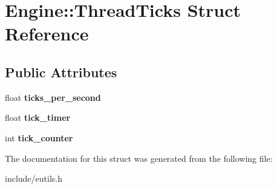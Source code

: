 \hypertarget{structEngine_1_1ThreadTicks}{}\section{Engine\+:\+:Thread\+Ticks Struct Reference}
\label{structEngine_1_1ThreadTicks}
\subsection*{Public Attributes}
\begin{DoxyCompactItemize}
\item 
\hypertarget{structEngine_1_1ThreadTicks_ae71adf8aee101beda4a5a500e886b13c}{}float {\bfseries ticks\+\_\+per\+\_\+second}\label{structEngine_1_1ThreadTicks_ae71adf8aee101beda4a5a500e886b13c}

\item 
\hypertarget{structEngine_1_1ThreadTicks_ab4cc7f346cc86e1a831214a17e3bd8dd}{}float {\bfseries tick\+\_\+timer}\label{structEngine_1_1ThreadTicks_ab4cc7f346cc86e1a831214a17e3bd8dd}

\item 
\hypertarget{structEngine_1_1ThreadTicks_a9b6a0ea4bb1069444e0ace9efd3bd8ec}{}int {\bfseries tick\+\_\+counter}\label{structEngine_1_1ThreadTicks_a9b6a0ea4bb1069444e0ace9efd3bd8ec}

\end{DoxyCompactItemize}


The documentation for this struct was generated from the following file\+:\begin{DoxyCompactItemize}
\item 
include/eutils.\+h\end{DoxyCompactItemize}
